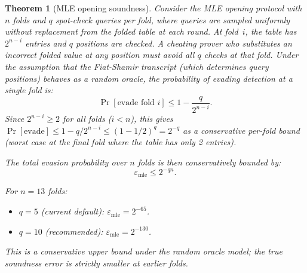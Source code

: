 \documentclass[10pt,twocolumn]{article}
\newtheorem{theorem}{Theorem}[section]
\theoremstyle{definition}
\theoremstyle{remark}
\begin{document}
\begin{theorem}[MLE opening soundness]\label{thm:mle}
  Consider the MLE opening protocol with $n$ folds and $q$
  spot-check queries per fold, where queries are sampled
  uniformly without replacement from the folded table at each
  round.
  At fold~$i$, the table has $2^{n-i}$ entries and $q$ positions
  are checked.
  A cheating prover who substitutes an incorrect folded value at
  any position must avoid all $q$ checks at that fold.
  Under the assumption that the Fiat-Shamir transcript
  (which determines query positions) behaves as a random oracle,
  the probability of evading detection at a single fold is:
  \[
    \Pr[\text{evade fold } i] \le 1 - \frac{q}{2^{n-i}}.
  \]
  Since $2^{n-i} \ge 2$ for all folds ($i < n$), this gives
  $\Pr[\text{evade}] \le 1 - q/2^{n-i} \le (1-1/2)^q = 2^{-q}$
  as a conservative per-fold bound (worst case at the final fold
  where the table has only 2 entries).

  The total evasion probability over $n$ folds is then
  conservatively bounded by:
  \begin{equation}\label{eq:mle-sound}
    \varepsilon_{\text{mle}} \le 2^{-qn}.
  \end{equation}

  For $n=13$ folds:
  \begin{itemize}[nosep,leftmargin=1.2em]
    \item $q=5$ (current default): $\varepsilon_{\text{mle}} = 2^{-65}$.
    \item $q=10$ (recommended): $\varepsilon_{\text{mle}} = 2^{-130}$.
  \end{itemize}
  This is a conservative upper bound under the random oracle
  model; the true soundness error is strictly smaller at
  earlier folds.
\end{theorem}
\end{document}

